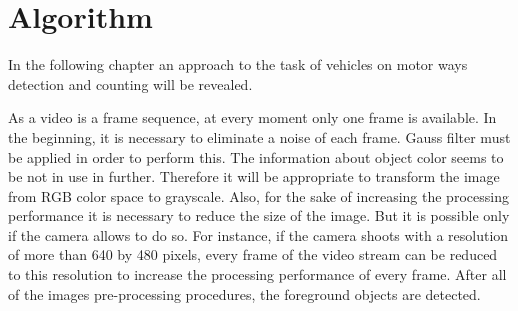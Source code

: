 \documentclass[12pt,a4paper,oneside,titlepage]{article}
\begin{document}
\section{Algorithm}



In the following chapter an approach to the task of vehicles on motor ways detection and counting will be revealed.

As a video is a frame sequence, at every moment only one frame is available.
In the beginning, it is necessary to eliminate a noise of each frame.
Gauss filter must be applied in order to perform this.
The information about object color seems to be not in use in further.
Therefore it will be appropriate to transform the image from RGB color space to grayscale.
Also, for the sake of increasing the processing performance it is necessary to reduce the size of the image.
But it is possible only if the camera allows to do so.
For instance, if the camera shoots with a resolution of more than 640 by 480 pixels, every frame of the video stream can be reduced to this resolution to increase the processing performance of every frame.
After all of the images pre-processing procedures, the foreground objects are detected.
\end{document}
